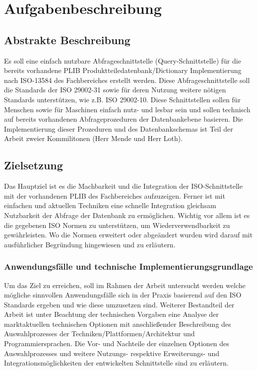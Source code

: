 \chapter{Aufgabenbeschreibung} \label{Aufgabenbeschreibung}

\section{Abstrakte Beschreibung}

Es soll eine einfach nutzbare Abfrageschnittstelle (Query-Schnittstelle) für die bereits vorhandene PLIB Produktteiledatenbank/Dictionary Implementierung nach ISO-13584 des Fachbereiches erstellt werden. Diese Abfrageschnittstelle soll die Standards der ISO 29002-31 sowie für deren Nutzung weitere nötigen Standards unterstützen, wie z.B. ISO 29002-10. Diese Schnittstellen sollen für Menschen sowie für Maschinen einfach nutz- und lesbar sein und sollen technisch auf bereits vorhandenen Abfrageprozeduren der Datenbankebene basieren. Die Implementierung dieser Prozeduren und des Datenbankschemas ist Teil der Arbeit zweier Kommilitonen (Herr Mende und Herr Loth).

\section{Zielsetzung}
Das Hauptziel ist es die Machbarkeit und die Integration der ISO-Schnittstelle mit der vorhandenen PLIB des Fachbereiches aufzuzeigen. 
Ferner ist mit einfachen und aktuellen Techniken eine schnelle Integration gleichsam Nutzbarkeit der Abfrage der Datenbank zu ermöglichen. Wichtig vor allem ist es die gegebenen ISO Normen zu unterstützen, um Wiederverwendbarkeit zu gewährleisten. Wo die Normen erweitert oder abgeändert wurden wird darauf mit ausführlicher Begründung hingewiesen und zu erläutern. 

\subsection{Anwendungsfälle und technische Implementierungsgrundlage}

Um das Ziel zu erreichen, soll im Rahmen der Arbeit untersucht werden welche mögliche sinnvollen Anwendungsfälle sich in der Praxis basierend auf den ISO Standards ergeben und wie diese umzusetzen sind. Weiterer Bestandteil der Arbeit ist unter Beachtung der technischen Vorgaben eine Analyse der marktaktuellen technischen Optionen mit anschließender Beschreibung des Auswahlprozesses der Techniken/Plattformen/Architektur und Programmiersprachen. Die Vor- und Nachteile der einzelnen Optionen des Auswahlprozesses und weitere Nutzungs- respektive Erweiterungs- und Integrationsmöglichkeiten der entwickelten Schnittstelle sind zu erläutern. 

